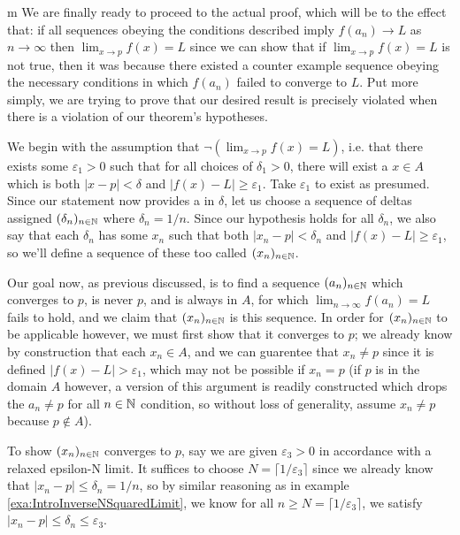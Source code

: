 \documentclass[11pt]{article}
\begin{document}
\begin{my proof}{m}
We are finally ready to proceed to the actual proof, which will be to the effect that: if all sequences obeying the conditions described imply $f(a_n) \to L$ as $n \to \infty$ then $\lim_{x \to p}f(x) = L$ since we can show that if $\lim_{x \to p} f(x) = L$  is not true, then it was because there existed a counter example sequence obeying the necessary conditions in which $f(a_n)$ failed to converge to $L$. Put more simply, we are trying to prove that our desired result is precisely violated when there is a violation of our theorem's hypotheses.

We begin with the assumption that $\neg(\lim_{x \to p} f(x) = L)$, i.e. that there exists some $\varepsilon_1 > 0$ such that for all choices of $\delta_1 > 0$, there will exist a $x \in A$ which is both $|x- p| < \delta$ and $|f(x) - L| \ge \varepsilon_1$. Take $\varepsilon_1$ to exist as presumed. Since our statement now provides a  in $\delta$, let us choose a sequence of deltas assigned $(\delta_n)_{n\in \mathbb{N}}$ where $\delta_n = 1/n$. Since our hypothesis holds for all $\delta_n$, we also say that each $\delta_n$ has some $x_n$ such that both $|x_n - p| < \delta_n$ and $|f(x) - L | \ge \varepsilon_1$, so we'll define a sequence of these too called $(x_n)_{n\in \mathbb{N}}$.

Our goal now, as previous discussed, is to find a sequence $(a_n)_{n\in \mathbb{N}}$ which converges to $p$, is never $p$, and is always in $A$, for which $\lim_{n \to \infty} f(a_n) = L$ fails to hold, and we claim that $(x_n)_{n\in \mathbb{N}}$ is this sequence. In order for $(x_n)_{n\in \mathbb{N}}$ to be applicable however, we must first show that it converges to $p$; we already know by construction that each $x_n\in A$, and we can guarentee that $x_n \neq p$ since it is defined $|f(x) - L| > \varepsilon_1$, which may not be possible if $x_n = p$ (if $p$ is in the domain $A$ however, a version of this argument is readily constructed which drops the $a_n \neq p$ for all $n\in \mathbb{N}$ condition, so without loss of generality, assume $x_n \neq p$ because $p \notin A$).

To show $(x_n)_{n\in \mathbb{N}}$ converges to $p$, say we are given $\varepsilon_3 > 0$ in accordance with a relaxed epsilon-N limit. It suffices to choose $N = \lceil 1/\varepsilon_3 \rceil$ since we already know that $|x_n - p| \le \delta_n = 1/n$, so by similar reasoning as in example \ref{exa:IntroInverseNSquaredLimit}, we know for all $n \ge N = \lceil 1/\varepsilon_3 \rceil$, we satisfy $|x_n - p| \le \delta_n \le \varepsilon_3$.


\end{my proof}
\end{document}
